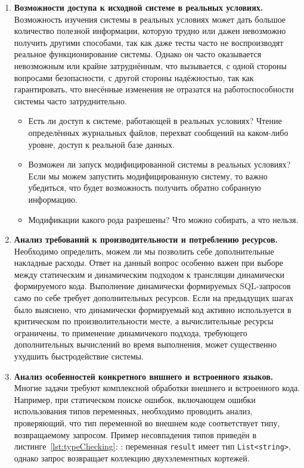 \begin{enumerate}
  \item \textbf{Возможности доступа к исходной системе в реальных условиях.} Возможность изучения системы в реальных условиях может дать большое количество полезной информации, которую трудно или дажен невозможно получить другими способами, так как даже тесты часто не воспроизводят реальное функционирование системы. Однако он часто оказывается невозможным или крайне затруднённым, что вызывается, с одной стороны вопросами безопасности, с другой стороны надёжностью, так как гарантировать, что внесённые изменения не отразатся на работоспособности системы часто затруднительно.  
  \begin{itemize}
    \item Есть ли доступ к системе, работающей в реальных условиях? Чтение определённых журнальных файлов, перехват сообщений на каком-либо уровне, доступ к реальной базе данных.
    \item Возможен ли запуск модифицированной системы в реальных условиях? Если мы можем запустить модифицированную систему, то важно убедиться, что будет возможность получить обратно собранную информацию.
    \item Модификации какого рода разрешены? Что можно собирать, а что нельзя.
  \end{itemize}
  
  \item \textbf{Анализ требований к производительности и потреблению ресурсов.} Необходимо определить, можем ли мы позволить себе дополнительные накладные расходы. Ответ на данный вопрос особенно важен при выборе между статическим и динамическим подходом к трансляции динамически формируемого кода. Выполнение динамически формируемых SQL-запросов само по себе требует дополнительных ресурсов. Если на предыдущих шагах было выяснено, что динамически формируемый код активно используется в критическом по произволительности месте, а вычислительные ресурсы ограничены, то применение динамичекого подхода, требующего дополнительных вычислений во время выполнения, может существенно ухудшить быстродействие системы.
  
  \item \textbf{Анализ особенностей конкретного вншнего и встроенного языков.} Многие задачи требуют комплексной обработки внешнего и встроенного кода. Например, при статическом поиске ошибок, включающем ошибки использования типов переменных, необходимо проводить анализ, проверяющий, что тип переменной во внешнем коде соответствует типу, возвращаемому запросом. Пример несовпадения типов приведён в листинге~\ref{lst:typeChecking}: : переменная \texttt{result} имеет тип \texttt{List<string>}, однако запрос возвращает коллекцию двухэлементных кортежей.
  

\end{enumerate}
